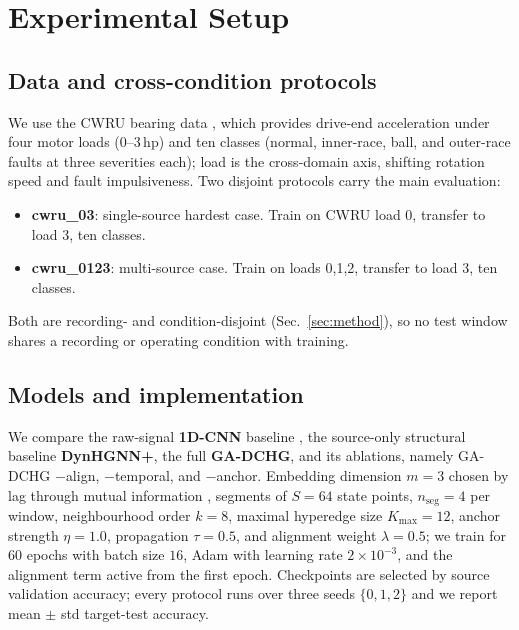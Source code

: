 \section{Experimental Setup}
\label{sec:setup}

\subsection{Data and cross-condition protocols}
\label{sec:data}

We use the CWRU bearing data \cite{zheng2019cwru}, which provides drive-end
acceleration under four motor loads (0--3\,hp) and ten classes (normal, inner-race,
ball, and outer-race faults at three severities each); load is the cross-domain
axis, shifting rotation speed and fault impulsiveness. Two disjoint protocols
carry the main evaluation:
\begin{itemize}
  \item \textbf{cwru\_03}: single-source hardest case. Train on CWRU load 0,
  transfer to load 3, ten classes.
  \item \textbf{cwru\_0123}: multi-source case. Train on loads 0,1,2, transfer
  to load 3, ten classes.
\end{itemize}
Both are recording- and condition-disjoint (Sec.~\ref{sec:method}), so no test
window shares a recording or operating condition with training.

\subsection{Models and implementation}
\label{sec:models}

We compare the raw-signal \textbf{1D-CNN} baseline \cite{ince2016real,
wen2018new,zhang2017new}, the source-only structural baseline
\textbf{DynHGNN+}, the full \textbf{GA-DCHG}, and its ablations, namely
GA-DCHG $-$align, $-$temporal, and $-$anchor. Embedding dimension $m=3$ chosen
by lag through mutual information \cite{fraser1986}, segments of $S=64$ state
points,
$n_{\mathrm{seg}}=4$ per window, neighbourhood order $k=8$, maximal hyperedge
size $K_{\max}=12$, anchor strength $\eta=1.0$, propagation $\tau=0.5$, and
alignment weight $\lambda=0.5$; we train for $60$ epochs with batch size $16$,
Adam with learning rate $2\times10^{-3}$, and the alignment term active from the
first epoch. Checkpoints are selected by source validation accuracy; every
protocol runs over three seeds $\{0,1,2\}$ and we report mean $\pm$ std
target-test accuracy.
